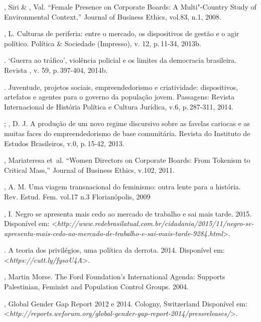 \begin{bibliohedra}
, Siri \& , Val. ``Female Presence on Corporate Boards: A
Multi"-Country Study of Environmental Context,'' Journal of Business
Ethics, vol.83, n.1, 2008.

, L. Culturas de periferia: entre o mercado, os dispositivos de
gestão e o agir político. Política \& Sociedade (Impresso), v. 12, p.\,11-34, 2013b.

\titidem. `Guerra ao tráfico', violência policial e os
limites da democracia brasileira. Revista , v. 59, p.\,397-404, 2014b.

\titidem. Juventude, projetos sociais, empreendedorismo e
criatividade: dispositivos, artefatos e agentes para o governo da
população jovem. Passagens: Revista Internacional de História Política e
Cultura Jurídica, v.6, p.\,287-311, 2014.

\titidem; , D. J. A produção de um novo regime discursivo
sobre as favelas cariocas e as muitas faces do empreendedorismo de base
comunitária. Revista do Instituto de Estudos Brasileiros, v.0, p.\,15-42,
2013.


, Mariateresa et~al. ``Women Directors on Corporate Boards: From
Tokenism to Critical Mass,'' Journal of Business Ethics, v.102, 2011.

, A. M. Uma viagem transnacional do feminismo: outra lente para a
história. Rev. Estud. Fem. vol.17 n.3 Florianópolis, 2009

, I. Negro se apresenta mais cedo ao mercado de trabalho e sai mais
tarde. 2015.
Disponível em: \textless{}\emph{http://www.redebrasilatual.com.br/cidadania/2015/11/negro-se-apresenta-mais-cedo-ao-mercado-de-trabalho-e-sai-mais-tarde-9284.html}\textgreater{}.

. A teoria dos privilégios, uma política da derrota. 2014.
Disponível em: \textless{}\emph{https://cutt.ly/fysoU4A}\textgreater{}.

, Martin Morse. The Ford Foundation's International Agenda:
Supports Palestinian, Feminist and Population Control Groups. 2004.

, Global Gender Gap Report 2012 e 2014. Cologny,
Switzerland
Disponível em: \textless{}\emph{http://reports.weforum.org/global-gender-gap-report-2014/pressreleases/}\textgreater{}.
\end{bibliohedra}